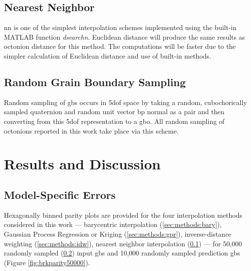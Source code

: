 \documentclass[preprint,12pt]{elsarticle}
\begin{document}
\subsection{Nearest Neighbor} \label{sec:methods:nn}

\Gls{nn} is one of the simplest interpolation schemes implemented using the built-in MATLAB function \textit{dsearchn}. Euclidean distance will produce the same results as octonion distance for this method. The computations will be faster due to the simpler calculation of Euclidean distance and use of built-in methods.

\subsection{Random Grain Boundary Sampling} \label{sec:methods:rand}

Random sampling of \glspl{gb} occurs in \gls{5dof} space by taking a random, cubochorically sampled quaternion and random unit vector \gls{bp} normal as a pair and then converting from this \gls{5dof} representation to a \gls{gbo}. All random sampling of octonions reported in this work take place via this scheme.

    
        
    

\section{Results and Discussion} \label{sec:results}

\subsection{Model-Specific Errors} \label{sec:results:mdlerror}

Hexagonally binned parity plots \cite{beanHexscatter2020} are provided for the four interpolation methods considered in this work --- barycentric interpolation (\ref{sec:methods:bary}), Gaussian Process Regression or Kriging (\ref{sec:methods:gpr}), inverse-distance weighting (\ref{sec:methods:idw}), nearest neighbor interpolation (\ref{sec:methods:nn}) --- for 50,000 randomly sampled (\ref{sec:methods:rand}) input \glspl{gb} and 10,000 randomly sampled prediction \glspl{gb} (Figure \ref{fig:brkparity50000}).
\end{document}
